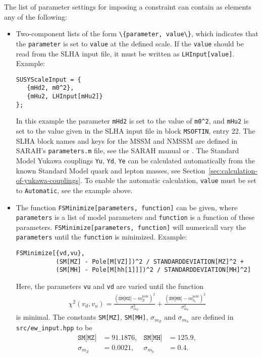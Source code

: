 \documentclass[final,3p,11pt,pdflatex]{elsarticle}
\newcommand{\code}[1]{\lstinline|#1|}  %
\newcommand{\pole}{\text{pole}}
\begin{document}
%
The list of parameter settings for imposing a constraint can contain
as elements any of the following:
%
\begin{itemize}
\item Two-component lists of the form \code{\{parameter, value\}},
  which indicates that the \code{parameter} is set to \code{value} at
  the defined scale.  If the \code{value} should be read from the SLHA
  input file, it must be written as \code{LHInput[value]}.  Example:
  \begin{lstlisting}
SUSYScaleInput = {
   {mHd2, m0^2},
   {mHu2, LHInput[mHu2]}
};
  \end{lstlisting}
  In this example the parameter \code{mHd2} is set to the value of
  \code{m0^2}, and \code{mHu2} is set to the value given in the SLHA
  input file in block \code{MSOFTIN}, entry 22.  The SLHA block names
  and keys for the MSSM and NMSSM are defined in SARAH's
  \code{parameters.m} file, see the SARAH manual or
  \cite{Staub:2010jh}.  The Standard Model Yukawa couplings \code{Yu},
  \code{Yd}, \code{Ye} can be calculated automatically from the known
  Standard Model quark and lepton masses, see
  Section~\ref{sec:calculation-of-yukawa-couplings}.  To enable the
  automatic calculation, \code{value} must be set to \code{Automatic},
  see the example above.

\item The function \code{FSMinimize[parameters, function]} can be
  given, where \code{parameters} is a list of model parameters and
  \code{function} is a function of these parameters.
  \code{FSMinimize[parameters, function]} will numericall vary the
  \code{parameters} until the \code{function} is minimized.  Example:
  \begin{lstlisting}
FSMinimize[{vd,vu},
           (SM[MZ] - Pole[M[VZ]])^2 / STANDARDDEVIATION[MZ]^2 +
           (SM[MH] - Pole[M[hh[1]]])^2 / STANDARDDEVIATION[MH]^2]
  \end{lstlisting}
  Here, the parameters \code{vu} and \code{vd} are varied until the
  function
  \begin{align}
    \chi^2(v_d,v_u) =
    \frac{(\texttt{SM[MZ]}-m_Z^\pole)^2}{\sigma_{m_Z}^2} +
    \frac{(\texttt{SM[MH]}-m_{h_1}^\pole)^2}{\sigma_{m_h}^2}
  \end{align}
  is minimal.  The constants \code{SM[MZ]}, \code{SM[MH]},
  $\sigma_{m_Z}$ and $\sigma_{m_h}$ are defined in
  \code{src/ew_input.hpp} to be
  \begin{align}
    \texttt{SM[MZ]} &= 91.1876, &
    \texttt{SM[MH]} &= 125.9, \\
    \sigma_{m_Z} &= 0.0021, &
    \sigma_{m_h} &= 0.4 .
  \end{align}


\end{itemize}
\end{document}
